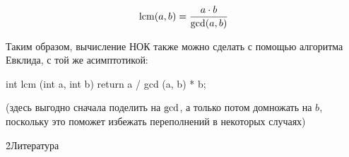 $$ {\rm lcm}(a,b) = \frac{ a \cdot b }{ {\rm gcd}(a,b) } $$

Таким образом, вычисление НОК также можно сделать с помощью алгоритма Евклида, с той же асимптотикой:

\code
int lcm (int a, int b) {
	return a / gcd (a, b) * b;
}
\endcode

(здесь выгодно сначала поделить на $\rm gcd$, а только потом домножать на $b$, поскольку это поможет избежать переполнений в некоторых случаях)


\h2{Литература}

\ul{
\li {}
}